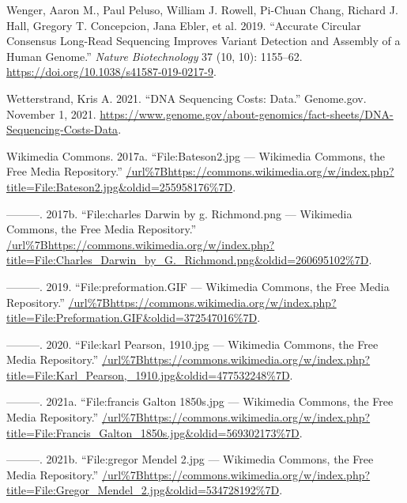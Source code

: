 \documentclass[
]{book}
\newlength{\cslhangindent}
\newlength{\cslentryspacingunit} %
\newenvironment{CSLReferences}[2] %
 {%
  \setlength{\parindent}{0pt}
  \ifodd #1
  \let\oldpar\par
  \def\par{\hangindent=\cslhangindent\oldpar}
  \fi
  \setlength{\parskip}{#2\cslentryspacingunit}
 }%
 {}
\begin{document}
\begin{CSLReferences}{1}{0}
\leavevmode{}%
Wenger, Aaron M., Paul Peluso, William J. Rowell, Pi-Chuan Chang, Richard J. Hall, Gregory T. Concepcion, Jana Ebler, et al. 2019. {``Accurate Circular Consensus Long-Read Sequencing Improves Variant Detection and Assembly of a Human Genome.''} \emph{Nature Biotechnology} 37 (10, 10): 1155--62. \url{https://doi.org/10.1038/s41587-019-0217-9}.

\leavevmode{}%
Wetterstrand, Kris A. 2021. {``{DNA Sequencing Costs}: {Data}.''} {Genome.gov}. November 1, 2021. \url{https://www.genome.gov/about-genomics/fact-sheets/DNA-Sequencing-Costs-Data}.

\leavevmode{}%
Wikimedia Commons. 2017a. {``File:Bateson2.jpg --- Wikimedia Commons{,} the Free Media Repository.''} \url{/url\%7Bhttps://commons.wikimedia.org/w/index.php?title=File:Bateson2.jpg\&oldid=255958176\%7D}.

\leavevmode{}%
---------. 2017b. {``File:charles Darwin by g. Richmond.png --- Wikimedia Commons{,} the Free Media Repository.''} \url{/url\%7Bhttps://commons.wikimedia.org/w/index.php?title=File:Charles_Darwin_by_G._Richmond.png\&oldid=260695102\%7D}.

\leavevmode{}%
---------. 2019. {``File:preformation.GIF --- Wikimedia Commons{,} the Free Media Repository.''} \url{/url\%7Bhttps://commons.wikimedia.org/w/index.php?title=File:Preformation.GIF\&oldid=372547016\%7D}.

\leavevmode{}%
---------. 2020. {``File:karl Pearson, 1910.jpg --- Wikimedia Commons{,} the Free Media Repository.''} \url{/url\%7Bhttps://commons.wikimedia.org/w/index.php?title=File:Karl_Pearson,_1910.jpg\&oldid=477532248\%7D}.

\leavevmode{}%
---------. 2021a. {``File:francis Galton 1850s.jpg --- Wikimedia Commons{,} the Free Media Repository.''} \url{/url\%7Bhttps://commons.wikimedia.org/w/index.php?title=File:Francis_Galton_1850s.jpg\&oldid=569302173\%7D}.

\leavevmode{}%
---------. 2021b. {``File:gregor Mendel 2.jpg --- Wikimedia Commons{,} the Free Media Repository.''} \url{/url\%7Bhttps://commons.wikimedia.org/w/index.php?title=File:Gregor_Mendel_2.jpg\&oldid=534728192\%7D}.


\end{CSLReferences}
\end{document}
